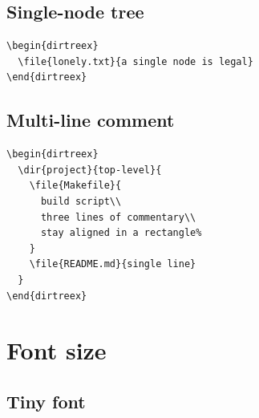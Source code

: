 \documentclass[11pt]{article}
\begin{document}
\begin{dirtreex}
\end{dirtreex}

\subsection{Single-node tree}

\begin{Verbatim}
\begin{dirtreex}
  \file{lonely.txt}{a single node is legal}
\end{dirtreex}
\end{Verbatim}

\begin{dirtreex}
\end{dirtreex}

\subsection{Multi-line comment}

\begin{Verbatim}
\begin{dirtreex}
  \dir{project}{top-level}{
    \file{Makefile}{
      build script\\
      three lines of commentary\\
      stay aligned in a rectangle%
    }
    \file{README.md}{single line}
  }
\end{dirtreex}
\end{Verbatim}

\begin{dirtreex}
\end{dirtreex}

\clearpage

\section{Font size}

\subsection{Tiny font}
\end{document}
